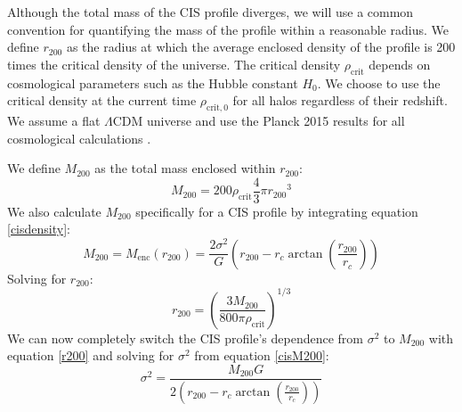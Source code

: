 \documentclass[10pt]{article}
\begin{document}
Although the total mass of the CIS profile diverges, we will use a common convention for quantifying the mass of the profile within a reasonable radius. We define $r_{200}$ as the radius at which the average enclosed density of the profile is 200 times the critical density of the universe. The critical density $\rho_\mathrm{crit}$ depends on cosmological parameters such as the Hubble constant $H_0$. We choose to use the critical density at the current time $\rho_\mathrm{crit,0}$ for all halos regardless of their redshift. We assume a flat $\Lambda$CDM universe and use the Planck 2015 results for all cosmological calculations \citep{PlanckCollaboration2015}.

We define $M_{200}$ as the total mass enclosed within $r_{200}$:
\begin{equation} \label{M200}
M_{200} = 200 \rho_\mathrm{crit} \frac{4}{3} \pi {r_{200}}^3
\end{equation}
We also calculate $M_{200}$ specifically for a CIS profile by integrating equation \ref{cisdensity}:
\begin{equation} \label{cisM200}
M_{200} = M_\mathrm{enc}(r_{200}) = \frac{2 \sigma^2}{G} \left( r_{200} - r_c \arctan{\left(\frac{r_{200}}{r_c}\right)} \right)
\end{equation}
Solving for $r_{200}$:
\begin{equation} \label{r200}
r_{200} = \left( \frac{3 M_{200}}{800 \pi \rho_\mathrm{crit}} \right)^{1/3}
\end{equation}
We can now completely switch the CIS profile's dependence from $\sigma^2$ to $M_{200}$ with equation \ref{r200} and solving for $\sigma^2$ from equation \ref{cisM200}:
\begin{equation}
\sigma^2 = \frac{M_{200} G}{2 \left( r_{200} - r_c \arctan{\left(\frac{r_{200}}{r_c}\right)} \right)}
\end{equation}
\end{document}

